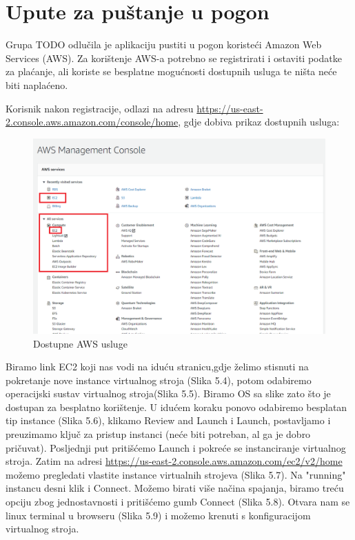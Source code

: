 			\eject 
		
		\section{Upute za puštanje u pogon}
		
			Grupa TODO odlučila je aplikaciju pustiti u pogon koristeći Amazon Web Services (AWS). Za korištenje AWS-a potrebno se registrirati i ostaviti podatke za plaćanje, ali koriste se besplatne mogućnosti dostupnih usluga te ništa neće biti naplaćeno. 
			
			Korisnik nakon registracije, odlazi na adresu \url{https://us-east-2.console.aws.amazon.com/console/home}, gdje dobiva prikaz dostupnih usluga:
			
			\begin{figure}[h]
				\includegraphics[scale=0.5]{slike/deployment_slike/awshome.png}
				\centering
				\caption{Dostupne AWS usluge}
				
			\end{figure}
		
			Biramo link EC2  koji nas vodi na iduću stranicu,gdje želimo stisnuti na pokretanje nove instance virtualnog stroja (Slika 5.4), potom odabiremo operacijski sustav virtualnog stroja(Slika 5.5). Biramo OS sa slike zato što je dostupan za besplatno korištenje. U idućem koraku ponovo odabiremo besplatan tip instance (Slika 5.6), klikamo Review and Launch i Launch, postavljamo i preuzimamo ključ za pristup instanci (neće biti potreban, al ga je dobro pričuvat). Posljednji put pritišćemo Launch i pokreće se instanciranje virtualnog stroja. Zatim na adresi \url{https://us-east-2.console.aws.amazon.com/ec2/v2/home} možemo pregledati vlastite instance virtualnih strojeva (Slika 5.7). Na "running" instancu desni klik i Connect. Možemo birati više načina spajanja, biramo treću opciju zbog jednostavnosti i pritišćemo gumb Connect (Slika 5.8). Otvara nam se linux terminal u browseru (Slika 5.9) i možemo krenuti s konfiguracijom virtualnog stroja.
			
